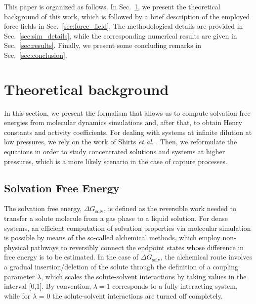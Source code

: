 \documentclass[3p,twocolumn]{elsarticle}
\begin{document}
This paper is organized as follows.
In Sec.~\ref{sec:theory}, we present the theoretical background of this work, which is followed by a brief description of the employed force fields in Sec.~\ref{sec:force_field}.
The methodological details are provided in Sec.~\ref{sec:sim_details}, while the corresponding numerical results are given in Sec.~\ref{sec:results}.
Finally, we present some concluding remarks in Sec.~\ref{sec:conclusion}.

\section{Theoretical background}
\label{sec:theory}

In this section, we present the formalism that allows us to compute solvation free energies from molecular dynamics simulations and, after that, to obtain Henry constants and activity coefficients.
For dealing with systems at infinite dilution at low pressures, we rely on the work of Shirts \textit{et al}. \cite{Shirts_2003}.
Then, we reformulate the equations in order to study concentrated solutions and systems at higher pressures, which is a more likely scenario in the case of  capture processes.

\subsection*{Solvation Free Energy}

The solvation free energy, $\Delta G_{\text{solv}}$, is defined as the reversible work needed to transfer a solute molecule from a gas phase to a liquid solution.
For dense systems, an efficient computation of solvation properties via molecular simulation is possible by means of the so-called alchemical methods, which employ non-physical pathways to reversibly connect the endpoint states whose difference in free energy is to be estimated.
In the case of $\Delta G_{\text{solv}}$, the alchemical route involves a gradual insertion/deletion of the solute through the definition of a coupling parameter $\lambda$, which scales the solute-solvent interactions by taking values in the interval [0,1]. By convention, $\lambda = 1$ corresponds to a fully interacting system, while for $\lambda$ = 0 the solute-solvent interactions are turned off completely.
\end{document}
